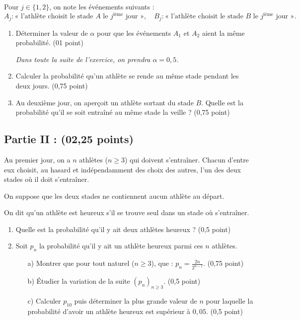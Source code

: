 \documentclass[11pt]{article}
\begin{document}
\noindent
Pour \( j \in \{1,2\} \), on note les événements suivants :
\[
A_j : \text{« l’athlète choisit le stade } A \text{ le } j^\text{ième} \text{ jour »}, \quad
B_j : \text{« l’athlète choisit le stade } B \text{ le } j^\text{ième} \text{ jour »}.
\]

\begin{enumerate}
    \item Déterminer la valeur de \( \alpha \) pour que les événements \( A_1 \) et \( A_2 \) aient la même probabilité. \hfill (01 point)

    \noindent \textit{Dans toute la suite de l’exercice, on prendra \( \alpha = 0{,}5 \).}

    \item Calculer la probabilité qu’un athlète se rende au même stade pendant les deux jours. \hfill (0,75 point)

    \item Au deuxième jour, on aperçoit un athlète sortant du stade \( B \). Quelle est la probabilité qu’il se soit entraîné au même stade la veille ? \hfill (0,75 point)
\end{enumerate}

\vspace{0.4cm}
\noindent
\subsection*{Partie II :  (02,25 points)}

\vspace{0.2cm}
\noindent
Au premier jour, on a \( n \) athlètes (\( n \geq 3 \)) qui doivent s’entraîner. Chacun d’entre eux choisit, au hasard et indépendamment des choix des autres, l’un des deux stades où il doit s’entraîner.

\noindent
On suppose que les deux stades ne contiennent aucun athlète au départ.

\noindent
On dit qu’un athlète est heureux s’il se trouve seul dans un stade où s’entraîner.

\begin{enumerate}
    \item Quelle est la probabilité qu’il y ait deux athlètes heureux ? \hfill (0,5 point)

    \item Soit \( p_n \) la probabilité qu’il y ait un athlète heureux parmi ces \( n \) athlètes.
    \begin{enumerate}
        \item[a)] Montrer que pour tout naturel (\( n \geq 3 \)), que : \( p_n = \frac{2n}{2^{n-1}} \). \hfill (0,75 point)
        \item[b)] Étudier la variation de la suite \( (p_n)_{n \geq 3} \). \hfill (0,5 point)
        \item[c)] Calculer \( p_{10} \) puis déterminer la plus grande valeur de \( n \) pour laquelle la probabilité d’avoir un athlète heureux est supérieur à \( 0{,}05 \). \hfill (0,5 point)
    \end{enumerate}
\end{enumerate}
\end{document}
